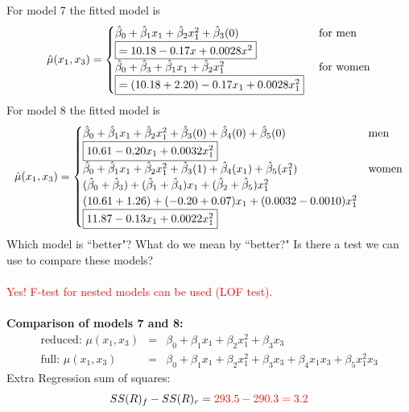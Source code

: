 For model 7 the fitted model is
\[
\hat{\mu}(x_1,x_3)=\begin{cases}  
\hat{\beta}_0 + \hat{\beta}_1 x_1 + \hat{\beta}_2 x_1^2 + \hat{\beta}_3 (0)
& \text{ for men} \\
\fbox{$=10.18 - 0.17 x +0.0028 x^2$} & \\
\hat{\beta}_0 + \hat{\beta}_3+\hat{\beta}_1 x_1 + \hat{\beta}_2 x_1^2
& \text{ for women} \\
\fbox{$=(10.18 + 2.20) - 0.17 x_1 +0.0028 x_1^2$} & \\
\end{cases}
\]
For model 8 the fitted model is
\[
\hat{\mu}(x_1,x_3)=\begin{cases} 
\hat{\beta}_0 + \hat{\beta}_1 x_1 + \hat{\beta}_2 x_1^2 + \hat{\beta}_3 (0) + \hat{\beta}_4(0) + \hat{\beta}_5(0)
& \text{men} \\
\fbox{$10.61 - 0.20 x_1 +0.0032 x_1^2$} & \\
\hat{\beta}_0 + \hat{\beta}_1 x_1 + \hat{\beta}_2 x_1^2 + \hat{\beta}_3 (1) + \hat{\beta}_4 (x_1) + \hat{\beta}_5(x_1^2) & \text{women} \\ 
(\hat{\beta}_0 + \hat{\beta}_3) + (\hat{\beta}_1 + \hat{\beta}_4)x_1 + (\hat{\beta}_2 + \hat{\beta}_5)x_1^2 & \\
(10.61 + 1.26) + (-0.20 +0.07) x_1 + (0.0032 -0.0010) x_1^2  & \\
\fbox{$11.87 - 0.13 x_1 + 0.0022  x_1^2$}  & \\
\end{cases}
\]
Which model is ``better"?  What do we mean by ``better?"  Is there a test we can use to compare these models?%
\textcolor{red}{\\~\\Yes!  F-test for nested models can be used (LOF test).}\\~\\

\textbf{Comparison of models 7 and 8:}\\
\begin{eqnarray*}
\text{reduced:  } \mu(x_1,x_3) &=& \beta_0 + \beta_1 x_1+ \beta_2 x_1^2+ \beta_3 x_3  \\
\text{full:  } \mu(x_1,x_3) &=& \beta_0 + \beta_1 x_1+ \beta_2 x_1^2+ \beta_3 x_3 + \beta_4 x_1x_3 + \beta_5 x_1^2 x_3
\end{eqnarray*}
Extra Regression sum of squares: 
$$SS(R)_f - SS(R)_r = \textcolor{red}{293.5 - 290.3 =3.2}$$

